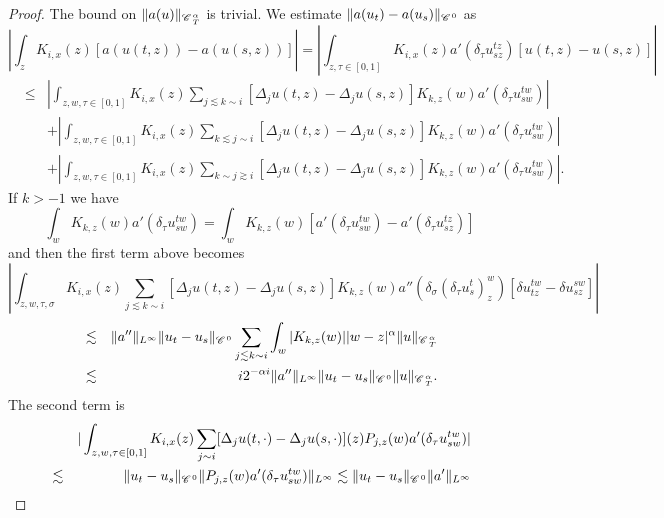 \documentclass{amsart}
\newcommand{\cdummy}{\cdot}
\theoremstyle{remark}
\theoremstyle{definition}
\newcommand{\CC}{\mathscr{C} \hspace{.1em}}
\begin{document}
\begin{proof}
  The bound on $\| a (u) \|_{\CC_T^{\alpha}}$ is trivial. We estimate $\| a
  (u_t) - a (u_s) \|_{\CC^0}$ as
  \[ | \int_z K_{i, x} (z) [a (u (t, z)) - a (u (s, z))] | = | \int_{z, \tau
     \in [0, 1]} K_{i, x} (z) a' (\delta_{\tau} u^{t z}_{s z}) [u (t, z) - u
     (s, z)] | \]
  \begin{eqnarray*}
    & \leqslant & | \int_{z, w, \tau \in [0, 1]} K_{i, x} (z) \sum_{j
    \lesssim k \sim i} [\Delta_j u (t, z) - \Delta_j u (s, z)] K_{k, z} (w) a'
    (\delta_{\tau} u^{t w}_{s w}) |\\
    &  & + | \int_{z, w, \tau \in [0, 1]} K_{i, x} (z) \sum_{k \lesssim j
    \sim i} [\Delta_j u (t, z) - \Delta_j u (s, z)] K_{k, z} (w) a'
    (\delta_{\tau} u^{t w}_{s w}) |\\
    &  & + | \int_{z, w, \tau \in [0, 1]} K_{i, x} (z) \sum_{k \sim j \gtrsim
    i} [\Delta_j u (t, z) - \Delta_j u (s, z)] K_{k, z} (w) a' (\delta_{\tau}
    u^{t w}_{s w}) | .
  \end{eqnarray*}
  If $k > - 1$ we have
  \[ \int_w K_{k, z} (w) a' (\delta_{\tau} u^{t w}_{s w}) = \int_w K_{k, z}
     (w) [a' (\delta_{\tau} u^{t w}_{s w}) - a' (\delta_{\tau} u^{t z}_{s z})]
  \]
  and then the first term above becomes
  \[ | \int_{z, w, \tau, \sigma} K_{i, x} (z) \sum_{j \lesssim k \sim i}
     [\Delta_j u (t, z) - \Delta_j u (s, z)] K_{k, z} (w) a'' (\delta_{\sigma}
     (\delta_{\tau} u^t_s)^w_z) [\delta u^{t w}_{t z} - \delta u^{s w}_{s z}]
     | \]
  \begin{eqnarray*}
    & \lesssim & \| a'' \|_{L^{\infty}} \| u_t - u_s \|_{\CC^0} \sum_{j
    \lesssim k \sim i} \int_w | K_{k, z} (w) | | w - z |^{\alpha} \| u
    \|_{\CC^{\alpha}_T}\\
    & \lesssim & i 2^{- \alpha i} \| a'' \|_{L^{\infty}} \| u_t - u_s
    \|_{\CC^0} \| u \|_{\CC^{\alpha}_T} .
  \end{eqnarray*}
  The second term is
  \begin{eqnarray*}
    &  & | \int_{z, w, \tau \in [0, 1]} K_{i, x} (z) \sum_{j \sim i}
    [\Delta_j u (t, \cdummy) - \Delta_j u (s, \cdummy)] (z) P_{j, z} (w) a'
    (\delta_{\tau} u^{t w}_{s w}) |\\
    & \lesssim & \| u_t - u_s \|_{\CC^0} \| P_{j, z} (w) a' (\delta_{\tau}
    u^{t w}_{s w}) \|_{L^{\infty}} \lesssim \| u_t - u_s \|_{\CC^0} \| a'
    \|_{L^{\infty}}
  \end{eqnarray*}
  

\end{proof}
\end{document}
